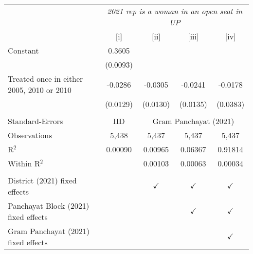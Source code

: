 
\begingroup
\centering
\begin{tabular}{lcccc}
   \toprule
    & \multicolumn{4}{c}{\textit{2021 rep is a woman in an open seat in UP}}\\
                                             & [i]      & [ii]          & [iii]         & [iv]\\  
   \midrule 
   Constant                                  & 0.3605   &               &               &   \\   
                                             & (0.0093) &               &               &   \\   
   Treated once in either 2005, 2010 or 2010 & -0.0286  & -0.0305       & -0.0241       & -0.0178\\   
                                             & (0.0129) & (0.0130)      & (0.0135)      & (0.0383)\\   
    \\
   Standard-Errors & IID & \multicolumn{3}{c}{Gram Panchayat (2021)} \\ 
   Observations                              & 5,438    & 5,437         & 5,437         & 5,437\\  
   R$^2$                                     & 0.00090  & 0.00965       & 0.06367       & 0.91814\\  
   Within R$^2$                              &          & 0.00103       & 0.00063       & 0.00034\\  
    \\
   District (2021) fixed effects             &          & $\checkmark$  & $\checkmark$  & $\checkmark$\\   
   Panchayat Block (2021) fixed effects      &          &               & $\checkmark$  & $\checkmark$\\   
   Gram Panchayat (2021) fixed effects       &          &               &               & $\checkmark$\\   
   \bottomrule
\end{tabular}
\par\endgroup


